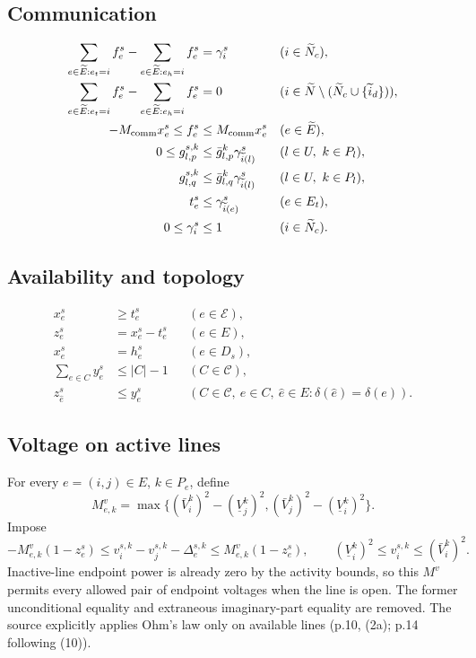\documentclass[11pt]{article}
\begin{document}
\subsection{Communication}
\begin{align*}
\sum_{e\in\widetilde E:e_t=i}f_e^s-
\sum_{e\in\widetilde E:e_h=i}f_e^s
 &=\gamma_i^s &&(i\in\widetilde N_c),\\
\sum_{e\in\widetilde E:e_t=i}f_e^s-
\sum_{e\in\widetilde E:e_h=i}f_e^s
 &=0 &&(i\in\widetilde N\setminus(\widetilde N_c\cup\{\widetilde i_d\})),\\
-M_{\rm comm}x_e^s\leq f_e^s
 &\leq M_{\rm comm}x_e^s &&(e\in\widetilde E),\\
0\leq g_{l,p}^{s,k}
 &\leq\bar g_{l,p}^k\gamma_{\widetilde i(l)}^s
 &&(l\in U,\ k\in P_l),\\
g_{l,q}^{s,k}
 &\leq\bar g_{l,q}^k\gamma_{\widetilde i(l)}^s
 &&(l\in U,\ k\in P_l),\\
t_e^s&\leq\gamma_{\widetilde i(e)}^s &&(e\in E_t),\\
0\leq\gamma_i^s&\leq1 &&(i\in\widetilde N_c).
\end{align*}

\subsection{Availability and topology}
\begin{align*}
x_e^s&\geq t_e^s &&(e\in\mathcal E),\\
z_e^s&=x_e^s-t_e^s &&(e\in E),\\
x_e^s&=h_e^s &&(e\in D_s),\\
\sum_{e\in C}y_e^s&\leq |C|-1 &&(C\in\mathcal C),\\
z_{\hat e}^s&\leq y_e^s
 &&(C\in\mathcal C,\ e\in C,\ \hat e\in E:\delta(\hat e)=\delta(e)).
\end{align*}

\subsection{Voltage on active lines}
For every $e=(i,j)\in E$, $k\in P_e$, define
\[
 M_{e,k}^{v}=\max\{(\bar V_i^k)^2-(\underline V_j^k)^2,
                    (\bar V_j^k)^2-(\underline V_i^k)^2\}.
\]
Impose
\[
-M_{e,k}^{v}(1-z_e^s)
\le v_i^{s,k}-v_j^{s,k}-\Delta_e^{s,k}
\le M_{e,k}^{v}(1-z_e^s),
\qquad
(\underline V_i^k)^2\le v_i^{s,k}\le(\bar V_i^k)^2.
\]
Inactive-line endpoint power is already zero by the activity bounds, so this
$M^v$ permits every allowed pair of endpoint voltages when the line is open.
The former unconditional equality and extraneous imaginary-part equality are
removed. The source explicitly applies Ohm's law only on available lines
(p.10, (2a); p.14 following (10)).
\end{document}
